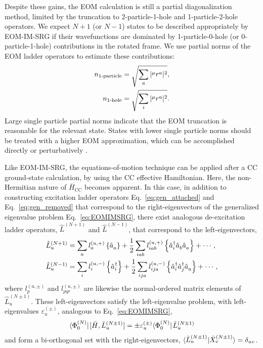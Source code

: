 \documentclass[thesis.tex]{subfiles}
\begin{document}
Despite these gains, the EOM calculation is still a partial diagonalization method, limited by the truncation to 2-particle-1-hole and 1-particle-2-hole operators. We expect $N + 1$ (or $N - 1$) states to be described appropriately by EOM-IM-SRG if their wavefunctions are dominated by 1-particle-0-hole (or 0-particle-1-hole) contributions in the rotated frame. We use partial norms of the EOM ladder operators to estimate these contributions:
\begin{align}
  \label{eq:partial_norms_p}
  n_{\text{1-particle}} &= \sqrt{\sum_a | {}^{\mu}r^{a}_{} |^2},\\
  \label{eq:partial_norms_h}
  n_{\text{1-hole}} &= \sqrt{\sum_i | {}^{\mu}r^{a}_{} |^2}.
\end{align}
Large single particle partial norms indicate that the EOM truncation is reasonable for the relevant state. States with lower single particle norms should be treated with a higher EOM approximation, which can be accomplished directly or perturbatively \cite{PARZUCHOWSKI2017044304}.

Like EOM-IM-SRG, the equations-of-motion technique can be applied after a CC ground-state calculation, by using the CC effective Hamiltonian.  Here, the non-Hermitian nature of $\bar{H}_{\mathrm{CC}}$ becomes apparent.  In this case, in addition to constructing excitation ladder operators Eq.\ \eqref{eq:gen_attached} and Eq.\ \eqref{eq:gen_removed} that correspond to the right-eigenvectors of the generalized eigenvalue problem Eq.\ \eqref{eq:EOMIMSRG}, there exist analogous de-excitation ladder operators, $\hat{L}^{(N + 1)}$ and $\hat{L}^{(N - 1)}$, that correspond to the left-eigenvectors,
\begin{align*}
    \hat{L}^{(N + 1)}_u &= \sum_a l^{(u, +)}_a \left\{\hat{a}_a^{}\right\} + \frac{1}{2} \sum_{i a b} l^{(u, +)}_{i a b} \left\{\hat{a}^\dagger_i \hat{a}_b^{} \hat{a}_a^{}\right\} + \cdots, \\
    \hat{L}^{(N - 1)}_u &= \sum_i l_i^{(u, -)} \left\{\hat{a}^\dagger_i\right\} + \frac{1}{2} \sum_{i j a} l^{(u, -)}_{i j a} \left\{\hat{a}^\dagger_i \hat{a}^\dagger_j \hat{a}_a^{}\right\} + \cdots,
\end{align*}
where $l^{(u, \pm)}_p$ and $l^{(u, \pm)}_{p q r}$ are likewise the normal-ordered matrix elements of $\hat{L}^{(N \pm 1)}_u$.  These left-eigenvectors satisfy the left-eigenvalue problem, with left-eigenvalues $\varepsilon^{(\pm)}_u$, analogous to Eq.\ \eqref{eq:EOMIMSRG},
\begin{align*}
  \langle \Phi^{(N)}_0 |\hspace{1pt} [\bar{H}, \bar{L}^{(N \pm 1)}_u] = \pm \varepsilon^{(\pm)}_u \langle \Phi^{(N)}_0 |\hspace{1pt} \bar{L}^{(N \pm 1)}_u
\end{align*}
and form a bi-orthogonal set with the right-eigenvectors, $\langle \bar{L}^{(N \pm 1)}_u | \bar{X}^{(N \pm 1)}_v\rangle = \delta_{u v}$.
\end{document}
